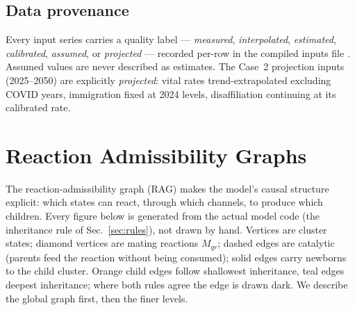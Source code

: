 \documentclass[11pt,a4paper]{article}
\begin{document}
\subsection{Data provenance}
\label{sec:provenance}
Every input series carries a quality label --- \emph{measured},
\emph{interpolated}, \emph{estimated}, \emph{calibrated},
\emph{assumed}, or \emph{projected} --- recorded per-row in the compiled
inputs file \cite{inputs-csv}.  Assumed values are never described as
estimates.  The Case~2 projection inputs (2025--2050) are explicitly
\emph{projected}: vital rates trend-extrapolated excluding COVID years,
immigration fixed at 2024 levels, disaffiliation continuing at its
calibrated rate.
\section{Reaction Admissibility Graphs}
\label{sec:rag}
The reaction-admissibility graph (RAG) makes the model's causal
structure explicit: which states can react, through which channels, to
produce which children.  Every figure below is generated from the
actual model code (the inheritance rule of Sec.~\ref{sec:rules}),
not drawn by hand.  Vertices are cluster states; diamond vertices are
mating reactions $M_{qr}$; dashed edges are catalytic (parents feed the
reaction without being consumed); solid edges carry newborns to the
child cluster.  Orange child edges follow shallowest inheritance, teal
edges deepest inheritance; where both rules agree the edge is drawn
dark.  We describe the global graph first, then the finer levels.
\end{document}
